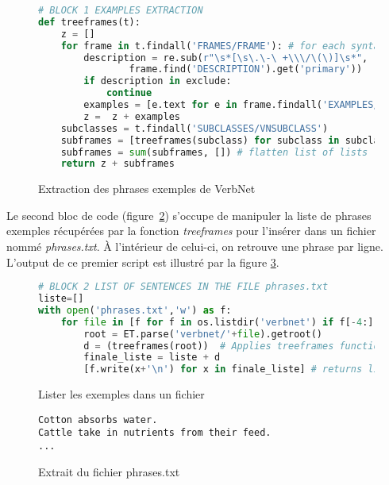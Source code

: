 \begin{figure}[htb]
  \caption{Extraction des phrases exemples de VerbNet}
	\label{lst:example1}
\begin{lstlisting}[language=Python]
# BLOCK 1 EXAMPLES EXTRACTION
def treeframes(t):
    z = []
    for frame in t.findall('FRAMES/FRAME'): # for each syntactic frame
        description = re.sub(r"\s*[\s\.\-\ +\\\/\(\)]\s*", '_',
				frame.find('DESCRIPTION').get('primary'))
        if description in exclude:
            continue    
        examples = [e.text for e in frame.findall('EXAMPLES/EXAMPLE')] # get the examples
        z =  z + examples 
    subclasses = t.findall('SUBCLASSES/VNSUBCLASS')
    subframes = [treeframes(subclass) for subclass in subclasses] #repeat operation for subclasses
    subframes = sum(subframes, []) # flatten list of lists
    return z + subframes
\end{lstlisting}
\end{figure}

Le second bloc de code (figure~\ref{lst:example2}) s'occupe de manipuler la liste de phrases exemples récupérées par la fonction \emph{treeframes} pour l'insérer dans un fichier nommé \emph{phrases.txt}. À l'intérieur de celui-ci, on retrouve une phrase par ligne. L'output de ce premier script est illustré par la figure \ref{lst:example3}.

\begin{figure}[htb]
  \caption{Lister les exemples dans un fichier}
	\label{lst:example2}
\begin{lstlisting}[language=Python]
# BLOCK 2 LIST OF SENTENCES IN THE FILE phrases.txt
liste=[]
with open('phrases.txt','w') as f:
    for file in [f for f in os.listdir('verbnet') if f[-4:] == '.xml']:
        root = ET.parse('verbnet/'+file).getroot()       
        d = (treeframes(root))  # Applies treeframes function to all of VerbNet files
        finale_liste = liste + d  
        [f.write(x+'\n') for x in finale_liste] # returns line after each example
\end{lstlisting}
\end{figure}

\begin{figure}[htb]
  \caption{Extrait du fichier phrases.txt}
	\label{lst:example3}
\begin{lstlisting}[language=mate]
Cotton absorbs water.
Cattle take in nutrients from their feed.
...
\end{lstlisting}
\end{figure}

